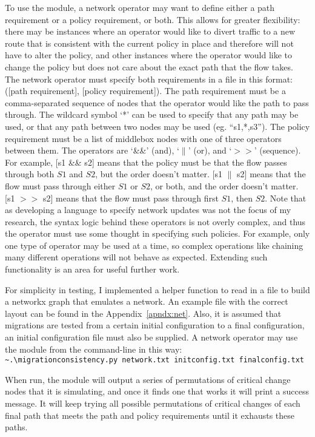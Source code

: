 \documentclass[pageno]{jpaper}
\begin{document}
To use the module, a network operator may want to define either a path requirement or a policy requirement, or both. This allows for greater flexibility: there may be instances where an operator would like to divert traffic to a new route that is consistent with the current policy in place and therefore will not have to alter the policy, and other instances where the operator would like to change the policy but does not care about the exact path that the flow takes. The network operator must specify both requirements in a file in this format: ([path requirement], [policy requirement]). The path requirement must be a comma-separated sequence of nodes that the operator would like the path to pass through. The wildcard symbol `*' can be used to specify that any path may be used, or that any path between two nodes may be used (eg. ``s1,*,s3''). The policy requirement must be a list of middlebox nodes with one of three operators between them. The operators are `\&\&' (and), `$\parallel$' (or), and `$>>$' (sequence). For example, [s1 \&\& s2] means that the policy must be that the flow passes through both $S1$ and $S2$, but the order doesn't matter. [s1 $\parallel$ s2] means that the flow must pass through either $S1$ or $S2$, or both, and the order doesn't matter. [s1 $>>$ s2] means that the flow must pass through first $S1$, then $S2$. Note that as developing a language to specify network updates was not the focus of my research, the syntax logic behind these operators is not overly complex, and thus the operator must use some thought in specifying such policies. For example, only one type of operator may be used at a time, so complex operations like chaining many different operations will not behave as expected. Extending such functionality is an area for useful further work.

For simplicity in testing, I implemented a helper function to read in a file to build a networkx graph that emulates a network. An example file with the correct layout can be found in the Appendix~\ref{apndx:net}. Also, it is assumed that migrations are tested from a certain initial configuration to a final configuration, an initial configuration file must also be supplied. A network operator may use the module from the command-line in this way:\\
\texttt{\textasciitilde .\textbackslash migration\textunderscore consistency.py network.txt init\textunderscore config.txt final\textunderscore config.txt}

When run, the module will output a series of permutations of critical change nodes that it is simulating, and once it finds one that works it will print a success message. It will keep trying all possible permutations of critical changes of each final path that meets the path and policy requirements until it exhausts these paths.
\end{document}
